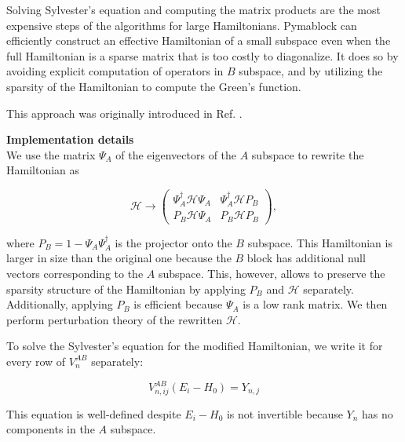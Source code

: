 Solving Sylvester's equation and computing the matrix products are the most
expensive steps of the algorithms for large Hamiltonians.
Pymablock can efficiently construct an effective Hamiltonian of a small
subspace even when the full Hamiltonian is a sparse matrix that is too costly to
diagonalize.
It does so by avoiding explicit computation of operators in $B$ subspace, and by
utilizing the sparsity of the Hamiltonian to compute the Green's function.

This approach was originally introduced in Ref.
\cite{https://doi.org/10.48550/arxiv.1909.09649}.

\begin{framed}
\textbf{Implementation details}\\
We use the matrix $\Psi_A$ of the eigenvectors of the $A$ subspace to rewrite
the Hamiltonian as

\begin{equation}
\label{H_implicit}
\mathcal{H} \to \begin{pmatrix}
\Psi_A^\dagger \mathcal{H} \Psi_A & \Psi_A^\dagger \mathcal{H} P_B \\
P_B \mathcal{H} \Psi_A & P_B \mathcal{H} P_B
\end{pmatrix},
\end{equation}

where $P_B = 1 - \Psi_A \Psi_A^\dagger$ is the projector onto the $B$ subspace.
This Hamiltonian is larger in size than the original one because the $B$ block has
additional null vectors corresponding to the $A$ subspace.
This, however, allows to preserve the sparsity structure of the Hamiltonian by applying
$P_B$ and $\mathcal{H}$ separately.
Additionally, applying $P_B$ is efficient because $\Psi_A$ is a low rank matrix.
We then perform perturbation theory of the rewritten $\mathcal{H}$.

To solve the Sylvester's equation for the modified Hamiltonian, we write it for
every row of $V_n^{AB}$ separately:

\begin{equation}
V_{n, ij}^{AB} (E_i - H_0) = Y_{n, j}
\end{equation}

This equation is well-defined despite $E_i - H_0$ is not invertible because
$Y_{n}$ has no components in the $A$ subspace.
\end{framed}
